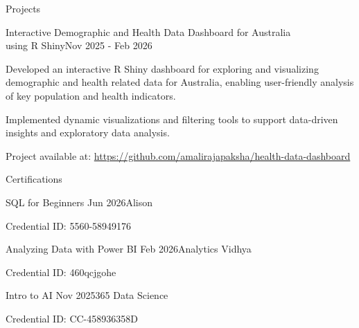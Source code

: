 \documentclass{resume} %
\begin{document}
\begin{rSection}{Projects}
		\vspace{0.7 cm}
		
		\begin{rSubsection}{Interactive Demographic and Health Data Dashboard for Australia \\ using R Shiny}{Nov 2025 - Feb 2026}{}{}
			\item Developed an interactive R Shiny dashboard for exploring and visualizing demographic and health related data for Australia, enabling user-friendly analysis of key population and health indicators.
			\item Implemented dynamic visualizations and filtering tools to support data-driven insights and exploratory data analysis.
		\end{rSubsection}
		\vspace{-0.3 cm}
		\item Project available at:
		\href{https://github.com/amalirajapaksha/health-data-dashboard-ongoing-}{https://github.com/amalirajapaksha/health-data-dashboard} \\
		
	\end{rSection}
	
	
	\hypersetup{
		colorlinks=true,
		linkcolor=black,
		urlcolor=black
	}
	
	\begin{rSection}{Certifications}
		
		\begin{rSubsection}{SQL for Beginners \href{https://alison.com/verify/2ec4c4c824}{\faExternalLink}}{Jun 2026}{Alison}{}
			\item Credential ID: 5560-58949176
		\end{rSubsection}
		
		\begin{rSubsection}{Analyzing Data with Power BI \href{https://courses.analyticsvidhya.com/certificates/460qcjgqhe}{\faExternalLink}}{Feb 2026}{Analytics Vidhya}{}
			\item Credential ID: 460qcjgohe
		\end{rSubsection}
		
		\begin{rSubsection}{Intro to AI \href{https://learn.365datascience.com/certificates/CC-458936358D/}{\faExternalLink}}{Nov 2025}{365 Data Science}{}
			\item Credential ID: CC-458936358D
		\end{rSubsection}
		
	\end{rSection}
	
\end{document}
